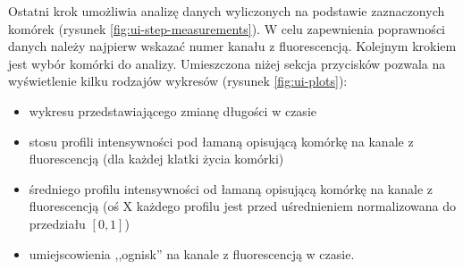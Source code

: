 \documentclass[declaration,shortabstract,mgr]{iithesis}
\begin{document}
Ostatni krok umożliwia analizę danych wyliczonych na podstawie zaznaczonych komórek (rysunek \ref{fig:ui-step-measurements}).
W celu zapewnienia poprawności danych należy najpierw wskazać numer kanału z fluorescencją. Kolejnym krokiem jest wybór komórki do analizy.
Umieszczona niżej sekcja przycisków pozwala na wyświetlenie kilku rodzajów wykresów (rysunek \ref{fig:ui-plots}):

\begin{itemize}
  \item wykresu przedstawiającego zmianę długości w czasie
  \item stosu profili intensywności pod łamaną opisującą komórkę na kanale z fluorescencją (dla każdej klatki życia komórki)
  \item średniego profilu intensywności od łamaną opisującą komórkę na kanale z fluorescencją (oś X każdego profilu jest przed uśrednieniem normalizowana do przedziału $[0, 1]$)
  \item umiejscowienia ,,ognisk'' na kanale z fluorescencją w czasie.
\end{itemize}
\end{document}

